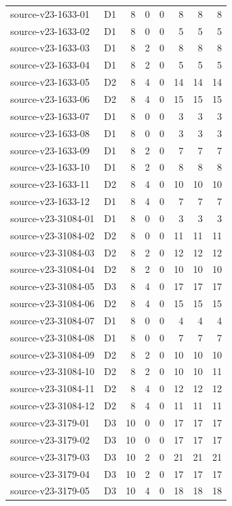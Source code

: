 \begin{longtable}{p{}lrrrrrr}
source-v23-1633-01 & D1 & 8 & 0 & 0 & 8 & 8 & 8\\
source-v23-1633-02 & D1 & 8 & 0 & 0 & 5 & 5 & 5\\
source-v23-1633-03 & D1 & 8 & 2 & 0 & 8 & 8 & 8\\
source-v23-1633-04 & D1 & 8 & 2 & 0 & 5 & 5 & 5\\
source-v23-1633-05 & D2 & 8 & 4 & 0 & 14 & 14 & 14\\
source-v23-1633-06 & D2 & 8 & 4 & 0 & 15 & 15 & 15\\
source-v23-1633-07 & D1 & 8 & 0 & 0 & 3 & 3 & 3\\
source-v23-1633-08 & D1 & 8 & 0 & 0 & 3 & 3 & 3\\
source-v23-1633-09 & D1 & 8 & 2 & 0 & 7 & 7 & 7\\
source-v23-1633-10 & D1 & 8 & 2 & 0 & 8 & 8 & 8\\
source-v23-1633-11 & D2 & 8 & 4 & 0 & 10 & 10 & 10\\
source-v23-1633-12 & D1 & 8 & 4 & 0 & 7 & 7 & 7\\
source-v23-31084-01 & D1 & 8 & 0 & 0 & 3 & 3 & 3\\
source-v23-31084-02 & D2 & 8 & 0 & 0 & 11 & 11 & 11\\
source-v23-31084-03 & D2 & 8 & 2 & 0 & 12 & 12 & 12\\
source-v23-31084-04 & D2 & 8 & 2 & 0 & 10 & 10 & 10\\
source-v23-31084-05 & D3 & 8 & 4 & 0 & 17 & 17 & 17\\
source-v23-31084-06 & D2 & 8 & 4 & 0 & 15 & 15 & 15\\
source-v23-31084-07 & D1 & 8 & 0 & 0 & 4 & 4 & 4\\
source-v23-31084-08 & D1 & 8 & 0 & 0 & 7 & 7 & 7\\
source-v23-31084-09 & D2 & 8 & 2 & 0 & 10 & 10 & 10\\
source-v23-31084-10 & D2 & 8 & 2 & 0 & 10 & 10 & 11\\
source-v23-31084-11 & D2 & 8 & 4 & 0 & 12 & 12 & 12\\
source-v23-31084-12 & D2 & 8 & 4 & 0 & 11 & 11 & 11\\
source-v23-3179-01 & D3 & 10 & 0 & 0 & 17 & 17 & 17\\
source-v23-3179-02 & D3 & 10 & 0 & 0 & 17 & 17 & 17\\
source-v23-3179-03 & D3 & 10 & 2 & 0 & 21 & 21 & 21\\
source-v23-3179-04 & D3 & 10 & 2 & 0 & 17 & 17 & 17\\
source-v23-3179-05 & D3 & 10 & 4 & 0 & 18 & 18 & 18\\

\end{longtable}
